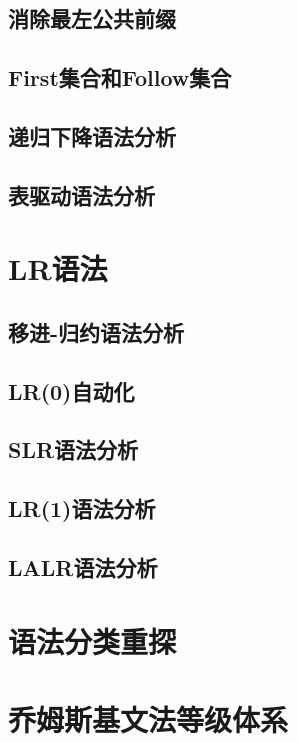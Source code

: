 \documentclass[cn,11pt,chinese]{elegantbook}
\begin{document}
\subsection{消除最左公共前缀}

\subsection{First集合和Follow集合}

\subsection{递归下降语法分析}

\subsection{表驱动语法分析}

\section{LR语法}

\subsection{移进-归约语法分析}

\subsection{LR(0)自动化}

\subsection{SLR语法分析}

\subsection{LR(1)语法分析}

\subsection{LALR语法分析}

\section{语法分类重探}

\section{乔姆斯基文法等级体系}
\end{document}
